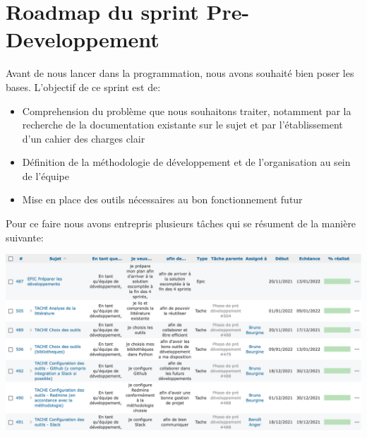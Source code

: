 \section{Roadmap du sprint Pre-Developpement}

Avant de nous lancer dans la programmation, nous avons souhaité bien poser les bases. L’objectif de ce sprint est de:
\begin{itemize}
    \item Comprehension du problème que nous souhaitons traiter, notamment par la recherche de la documentation existante sur
     le sujet et par l'établissement d’un cahier des charges clair
    \item Définition de la méthodologie de développement et de l’organisation au sein de l'équipe
    \item Mise en place des outils nécessaires au bon fonctionnement futur
\end{itemize}


Pour ce faire nous avons entrepris plusieurs tâches qui se résument de la manière suivante:

\begin{center}
    \includegraphics[width=17cm]{images/roadmap-predev-part1.png}
\end{center}

